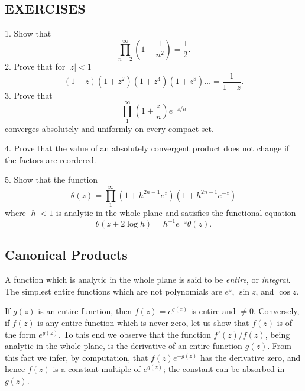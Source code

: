 \subsection*{EXERCISES}
1. Show that
\begin{equation*}
\prod_ {n = 2} ^ {\infty} \left(1 - \frac {1}{n ^ {2}}\right) = \frac {1}{2}.
\end{equation*}
2. Prove that for $|z| < 1$
\begin{equation*}
(1 + z) (1 + z ^ {2}) (1 + z ^ {4}) (1 + z ^ {8}) \dots = \frac {1}{1 - z}.
\end{equation*}
3. Prove that
\begin{equation*}
\prod_ {1} ^ {\infty} \left(1 + \frac {z}{n}\right) e ^ {- z / n}
\end{equation*}
converges absolutely and uniformly on every compact set.

4. Prove that the value of an absolutely convergent product does not change if the factors are reordered.

5. Show that the function
\begin{equation*}
\theta (z) = \prod_ {1} ^ {\infty} (1 + h ^ {2 n - 1} e ^ {z}) (1 + h ^ {2 n - 1} e ^ {- z})
\end{equation*}
where $|h| < 1$ is analytic in the whole plane and satisfies the functional equation
\begin{equation*}
\theta (z + 2 \log h) = h ^ {- 1} e ^ {- z} \theta (z).
\end{equation*}
\setcounter{section}{2}\setcounter{subsection}{2}\subsection{Canonical Products}\label{sec:5.2.3}
A function which is analytic in the whole plane is said to be \emph{entire}, or \emph{integral}. The simplest entire functions which are not polynomials are $e^{z}$, $\sin z$, and $\cos z$.

If $g(z)$ is an entire function, then $f(z) = e^{g(z)}$ is entire and $\neq 0$. Conversely, if $f(z)$ is any entire function which is never zero, let us show
that $f(z)$ is of the form $e^{g(z)}$. To this end we observe that the function $f'(z)/f(z)$, being analytic in the whole plane, is the derivative of an entire function $g(z)$. From this fact we infer, by computation, that $f(z)e^{-g(z)}$ has the derivative zero, and hence $f(z)$ is a constant multiple of $e^{g(z)}$; the constant can be absorbed in $g(z)$.

